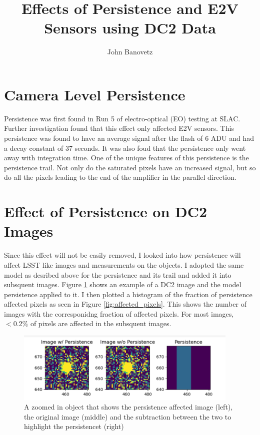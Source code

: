 \documentclass[DM,authoryear,toc]{lsstdoc}
\title{Effects of Persistence and E2V Sensors using DC2 Data}
\author{%
John Banovetz
}
\date{\vcsDate}
\begin{document}
\maketitle


\section{Camera Level Persistence}
Persistence was first found in Run 5 of electro-optical (EO) testing at SLAC. Further investigation found that this effect only affected E2V sensors. 
This persistence was found to have an average signal after the flash of 6 ADU and had a decay constant of 37 seconds. 
It was also foud that the persistence only went away with integration time. One of the unique features of this persistence is the persistence trail. 
Not only do the saturated pixels have an increased signal, but so do all the pixels leading to the end of the amplifier in the parallel direction.


\section{Effect of Persistence on DC2 Images}

Since this effect will not be easily removed, I looked into how persistence will affect LSST like images and measurements on the objects. 
I adopted the same model as desribed above for the persistence and its trail and added it into subsquent images. 
Figure \ref{fig:ex_persistence} shows an example of a DC2 image and the model persistence applied to it. 
I then plotted a histogram of the fraction of persistence affected pixels as seen in Figure \ref{fig:affected_pixels}. 
This shows the number of images with the corresponidng fraction of affected pixels. 
For most images, $<0.2\%$ of pixels are affected in the subsquent images.


\begin{figure}[!htp]
  \centering
  \includegraphics[width=0.95\textwidth, angle=0]{Obj_pers.png}
  \caption{
  A zoomed in object that shows the persistence affected image (left), the original image (middle) 
  and the subtraction between the two to highlight the persistencet (right)
  }
\label{fig:ex_persistence}
\end{figure}
\end{document}
